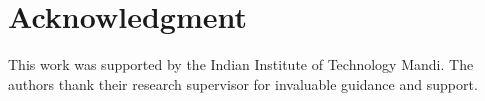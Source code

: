 \documentclass[conference]{IEEEtran}
\begin{document}
\section*{Acknowledgment}

This work was supported by the Indian Institute of Technology
Mandi. The authors thank their research supervisor for
invaluable guidance and support.



\end{document}
